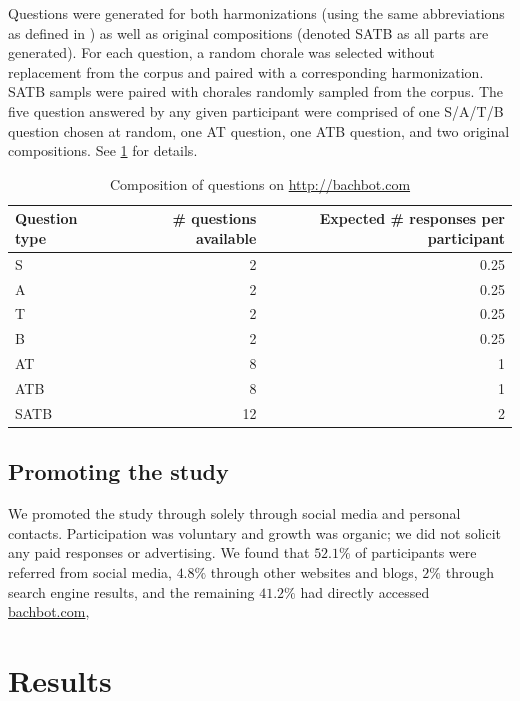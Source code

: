 Questions were generated for both harmonizations (using the same abbreviations
as defined in ) as well as original compositions (denoted SATB as all parts
are generated). For each question, a random chorale was selected without
replacement from the corpus and paired with a corresponding harmonization.
SATB sampls were paired with chorales randomly sampled from the corpus. The
five question answered by any given participant were comprised of one S/A/T/B
question chosen at random, one AT question, one ATB question, and two original
compositions. See \cref{tab:bachbot-com-question-distribtion} for details.

\begin{table}[tb]
  \centering
  \begin{tabular}{lrr}
    \toprule
    Question type & \# questions available & Expected \# responses per participant \\
    \midrule
    S        & 2  & 0.25 \\
    A        & 2  & 0.25 \\
    T        & 2  & 0.25 \\
    B        & 2  & 0.25 \\
    AT       & 8  & 1 \\
    ATB      & 8  & 1 \\
    SATB     & 12 & 2 \\
    \bottomrule
  \end{tabular}
  \caption{Composition of questions on \url{http://bachbot.com}}
  \label{tab:bachbot-com-question-distribtion}
\end{table}

\subsection{Promoting the study}

We promoted the study through solely through social media and personal
contacts. Participation was voluntary and growth was organic; we did not
solicit any paid responses or advertising. We found that $52.1\%$
of participants were referred from social media, $4.8\%$ through other websites
and blogs, $2\%$ through search engine results, and the remaining $41.2\%$ had
directly accessed \url{bachbot.com},

\section{Results}

